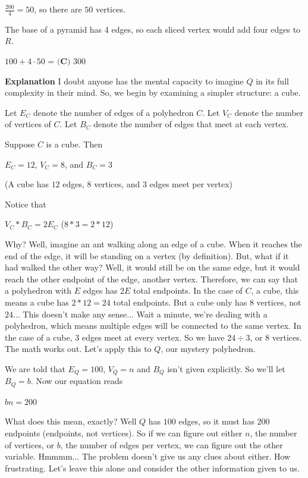 \begin{enumerate}
 $\frac{200}{4} = 50$, so there are $50$ vertices.

 The base of a pyramid has 4 edges, so each sliced vertex would add four edges to $R$.

 $100 + 4 \cdot 50$ = $\boxed{\textbf{(C) } 300}$

 \textbf{Explanation} I doubt anyone has the mental capacity to imagine $Q$ in its full complexity in their mind. So, we begin by examining a simpler structure: a cube.

 
Let $E_C$ denote the number of edges of a polyhedron $C$. Let $V_C$ denote the number of vertices of $C$. Let $B_C$ denote the number of edges that meet at each vertex.

 
Suppose $C$ is a cube. Then

 
$E_C = 12$, $V_C = 8$, and $B_C = 3$

 
(A cube has $12$ edges, $8$ vertices, and $3$ edges meet per vertex)

 
Notice that

 
$V_C*B_C = 2E_C$ ($8*3 = 2*12$)

 
Why? Well, imagine an ant walking along an edge of a cube. When it reaches the end of the edge, it will be standing on a vertex (by definition). But, what if it had walked the other way? Well, it would still be on the same edge, but it would reach the other endpoint of the edge, another vertex. Therefore, we can say that a polyhedron with $E$ edges has $2E$ total endpoints. In the case of $C$, a cube, this means a cube has $2*12 = 24$ total endpoints. But a cube only has $8$ vertices, not $24$... This doesn't make any sense... Wait a minute, we're dealing with a polyhedron, which means multiple edges will be connected to the same vertex. In the case of a cube, $3$ edges meet at every vertex. So we have $24 \div 3$, or $8$ vertices. The math works out. Let's apply this to $Q$, our mystery polyhedron.

 
We are told that $E_Q = 100$, $V_Q = n$ and $B_Q$ isn't given explicitly. So we'll let $B_Q = b$. Now our equation reads

 
$bn = 200$

 
What does this mean, exactly? Well $Q$ has $100$ edges, so it must has $200$ endpoints (endpoints, not vertices). So if we can figure out either $n$, the number of vertices, or $b$, the number of edges per vertex, we can figure out the other variable. Hmmmm... The problem doesn't give us any clues about either. How frustrating. Let's leave this alone and consider the other information given to us.


\end{enumerate}

